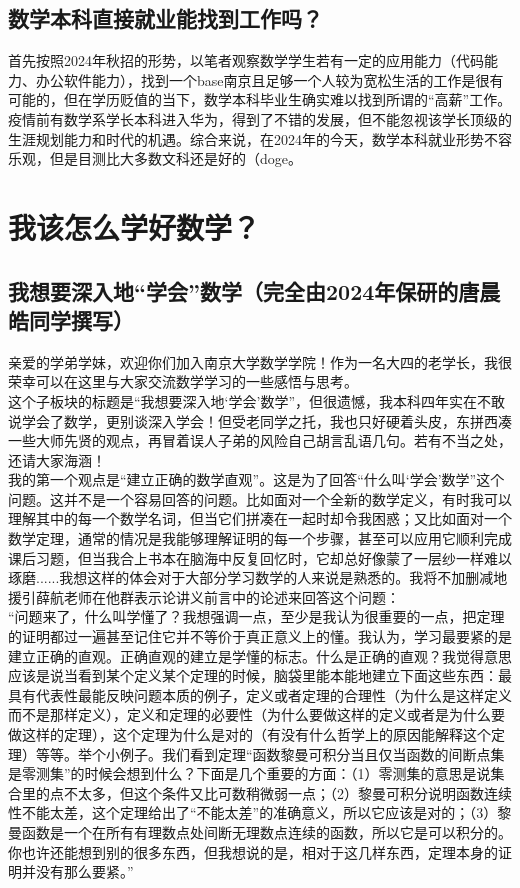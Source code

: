 \documentclass[a4paper,11pt,notitlepage]{article}
\begin{document}
\subsection{数学本科直接就业能找到工作吗？}
首先按照2024年秋招的形势，以笔者观察数学学生若有一定的应用能力（代码能力、办公软件能力），找到一个base南京且足够一个人较为宽松生活的工作是很有可能的，但在学历贬值的当下，数学本科毕业生确实难以找到所谓的“高薪”工作。疫情前有数学系学长本科进入华为，得到了不错的发展，但不能忽视该学长顶级的生涯规划能力和时代的机遇。综合来说，在2024年的今天，数学本科就业形势不容乐观，但是目测比大多数文科还是好的（doge。

\section{我该怎么学好数学？}
\subsection{我想要深入地“学会”数学（完全由2024年保研的唐晨皓同学撰写）}
亲爱的学弟学妹，欢迎你们加入南京大学数学学院！作为一名大四的老学长，我很荣幸可以在这里与大家交流数学学习的一些感悟与思考。\\
\indent 这个子板块的标题是“我想要深入地‘学会’数学”，但很遗憾，我本科四年实在不敢说学会了数学，更别谈深入学会！但受老同学之托，我也只好硬着头皮，东拼西凑一些大师先贤的观点，再冒着误人子弟的风险自己胡言乱语几句。若有不当之处，还请大家海涵！\\
\indent 我的第一个观点是“建立正确的数学直观”。这是为了回答“什么叫‘学会’数学”这个问题。这并不是一个容易回答的问题。比如面对一个全新的数学定义，有时我可以理解其中的每一个数学名词，但当它们拼凑在一起时却令我困惑；又比如面对一个数学定理，通常的情况是我能够理解证明的每一个步骤，甚至可以应用它顺利完成课后习题，但当我合上书本在脑海中反复回忆时，它却总好像蒙了一层纱一样难以琢磨......我想这样的体会对于大部分学习数学的人来说是熟悉的。我将不加删减地援引薛航老师在他群表示论讲义前言中的论述来回答这个问题：\\
\indent “问题来了，什么叫学懂了？我想强调一点，至少是我认为很重要的一点，把定理的证明都过一遍甚至记住它并不等价于真正意义上的懂。我认为，学习最要紧的是建立正确的直观。正确直观的建立是学懂的标志。什么是正确的直观？我觉得意思应该是说当看到某个定义某个定理的时候，脑袋里能本能地建立下面这些东西：最具有代表性最能反映问题本质的例子，定义或者定理的合理性（为什么是这样定义而不是那样定义），定义和定理的必要性（为什么要做这样的定义或者是为什么要做这样的定理），这个定理为什么是对的（有没有什么哲学上的原因能解释这个定理）等等。举个小例子。我们看到定理“函数黎曼可积分当且仅当函数的间断点集是零测集”的时候会想到什么？下面是几个重要的方面：（1）零测集的意思是说集合里的点不太多，但这个条件又比可数稍微弱一点；（2）黎曼可积分说明函数连续性不能太差，这个定理给出了“不能太差”的准确意义，所以它应该是对的；（3）黎曼函数是一个在所有有理数点处间断无理数点连续的函数，所以它是可以积分的。你也许还能想到别的很多东西，但我想说的是，相对于这几样东西，定理本身的证明并没有那么要紧。”\\
\end{document}
